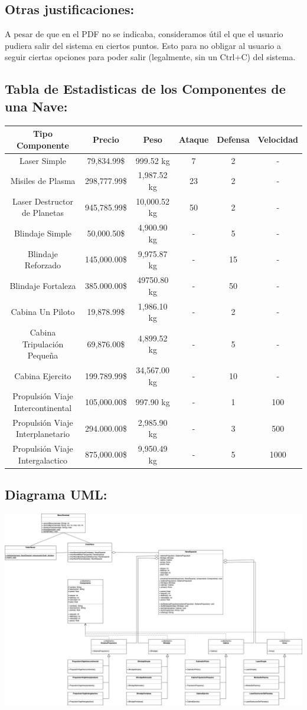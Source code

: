 \documentclass{article}
\begin{document}
\subsection*{Otras justificaciones:}
A pesar de que en el PDF no se indicaba, consideramos útil el que el usuario pudiera salir del sistema en ciertos puntos. Esto para no obligar al usuario a seguir ciertas opciones para poder salir (legalmente, sin un Ctrl+C) del sistema.

\subsection*{Tabla de Estadisticas de los Componentes de una Nave:}
\begin{table}[h!]
	\centering
	\begin{tabular}{|c|c|c|c|c|c|}
		\hline
		Tipo Componente & Precio & Peso & Ataque & Defensa & Velocidad \\ \hline
		Laser Simple & 79,834.99\$ & 999.52 kg & 7 & 2 & - \\
		Misiles de Plasma & 298,777.99\$ & 1,987.52 kg & 23 & 2 & - \\
		Laser Destructor de Planetas & 945,785.99\$ & 10,000.52 kg & 50 & 2 & - \\
		Blindaje Simple & 50,000.50\$ & 4,900.90 kg & - & 5 & - \\
		Blindaje Reforzado & 145,000.00\$ & 9,975.87 kg & - & 15 & - \\
		Blindaje Fortaleza & 385.000.00\$ & 49750.80 kg & - & 50 & - \\
		Cabina Un Piloto & 19,878.99\$ & 1,986.10 kg & - & 2 & - \\
		Cabina Tripulación Pequeña & 69,876.00\$ & 4,899.52 kg & - & 5 & - \\
		Cabina Ejercito & 199.789.99\$ & 34,567.00 kg & - & 10 & - \\
		Propulsión Viaje Intercontinental & 105,000.00\$ & 997.90 kg & - & 1 & 100 \\
		Propulsión Viaje Interplanetario & 294.000.00\$ & 2,985.90 kg & - & 3 & 500 \\
		Propulsión Viaje Intergalactico & 875,000.00\$ & 9,950.49 kg & - & 5 & 1000 \\ \hline
	\end{tabular}
\end{table}

\newpage
\subsection*{Diagrama UML:}
\begin{center}
  \includegraphics[scale=0.18]{./Practica04UML.png}
\end{center}
\end{document}
